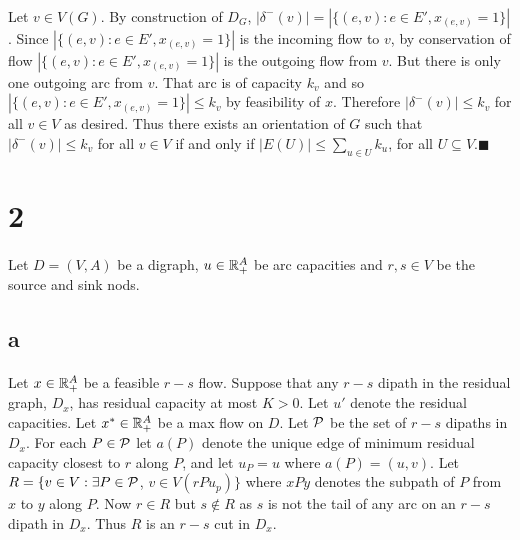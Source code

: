 \documentclass[letterpaper,12pt,oneside,onecolumn]{article}
\begin{document}
\paragraph{}
Let $v \in V(G)$. By construction of $D_G$, $|\delta^-(v)| = |\{(e,v) : e \in E', x_{(e,v)} = 1\}|$. Since $|\{(e,v) : e \in E', x_{(e,v)} = 1\}|$ is the incoming flow to $v$, by conservation of flow $|\{(e,v) : e \in E', x_{(e,v)} = 1\}|$ is the outgoing flow from $v$. But there is only one outgoing arc from $v$. That arc is of capacity $k_v$ and so $|\{(e,v) : e \in E', x_{(e,v)} = 1\}| \leq k_v$ by feasibility of $x$. Therefore $|\delta^-(v)| \leq k_v$ for all $v \in V$ as desired. Thus there exists an orientation of $G$ such that $|\delta^-(v)| \leq k_v$ for all $v \in V$ if and only if $|E(U)| \leq \sum_{u \in U} k_u$, for all $U \subseteq V$.$\blacksquare$

\section*{2}
\paragraph{}
Let $D=(V,A)$ be a digraph, $u \in \mathbb{R}_+^A$ be arc capacities and $r,s \in V$ be the source and sink nods.
\subsection*{a}
\paragraph{}
Let $x \in \mathbb{R}_+^A$ be a feasible $r-s$ flow. Suppose that any $r-s$ dipath in the residual graph, $D_x$, has residual capacity at most $K > 0$. Let $u'$ denote the residual capacities. Let $x^* \in \mathbb{R}_+^A$ be a max flow on $D$. Let $\mathcal{P}$ be the set of $r-s$ dipaths in $D_x$. For each $P \in \mathcal{P}$ let $a(P)$ denote the unique edge of minimum residual capacity closest to $r$ along $P$, and let $u_P = u$ where $a(P) = (u,v)$. Let $R = \{v \in V: \exists P \in \mathcal{P}$, $v \in V(rPu_p)\}$ where $xPy$ denotes the subpath of $P$ from $x$ to $y$ along $P$. Now $r \in R$ but $s \not\in R$ as $s$ is not the tail of any arc on an $r-s$ dipath in $D_x$. Thus $R$ is an $r-s$ cut in $D_x$.
\end{document}
